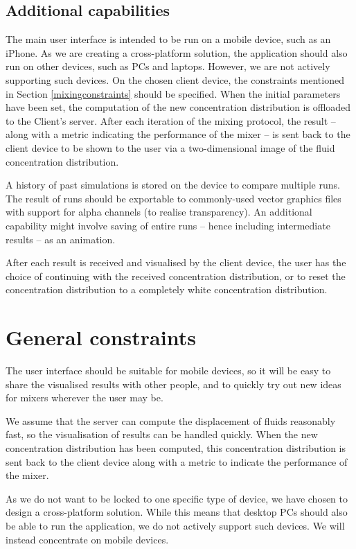 \subsection{Additional capabilities}
The main user interface is intended to be run on a mobile device, such as an iPhone. As we are creating a cross-platform solution, the application should also run on other devices, such as PCs and laptops. However, we are not actively supporting such devices. On the chosen client device, the constraints mentioned in Section \ref{mixingconstraints} should be specified. When the initial parameters have been set, the computation of the new concentration distribution is offloaded to the Client's server. After each iteration of the mixing protocol, the result -- along with a metric indicating the performance of the mixer -- is sent back to the client device to be shown to the user via a two-dimensional image of the fluid concentration distribution.

A history of past simulations is stored on the device to compare multiple runs. The result of runs should be exportable to commonly-used vector graphics files with support for alpha channels (to realise transparency). An additional capability might involve saving of entire runs -- hence including intermediate results -- as an animation.

After each result is received and visualised by the client device, the user has the choice of continuing with the received concentration distribution, or to reset the concentration distribution to a completely white concentration distribution.

\section{General constraints}
The user interface should be suitable for mobile devices, so it will be easy to share the visualised results with other people, and to quickly try out new ideas for mixers wherever the user may be.

We assume that the server can compute the displacement of fluids reasonably fast, so the visualisation of results can be handled quickly. When the new concentration distribution has been computed, this concentration distribution is sent back to the client device along with a metric to indicate the performance of the mixer.

As we do not want to be locked to one specific type of device, we have chosen to design a cross-platform solution. While this means that desktop PCs should also be able to run the application, we do not actively support such devices. We will instead concentrate on mobile devices.


